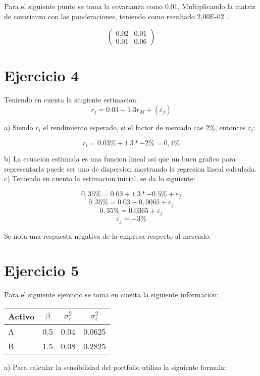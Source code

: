 \documentclass{article}
\begin{document}
Para el siguiente punto se toma la covarianza como 0.01, Multiplicando la matriz de covarianza con las ponderaciones, teniendo como resultado 2,00E-02
. 

\[
\begin{pmatrix}
0.02 & 0.01 \\
0.01 & 0.06
\end{pmatrix}
\]

\section{Ejercicio 4}
Teniendo en cuenta la siugiente estimacion.
\[
r_j = 0.03 + 1.3 r_M + (\varepsilon_j) 
\]

a) Siendo $r_i$ el rendimiento esperado, si el factor de mercado cae 2\%, entonces $r_i$:

\[
r_i = 0.03\% + 1.3 * -2\% = 0,4\%
\]

b) La ecuacion estimada es una funcion lineal asi que un buen grafico para representarla puede ser uno de dispersion mostrando la regresion lineal calculada.
\\

c) Teniendo en cuenta la estimacion inicial, se da lo siguiente:

\[
0,35\% = 0.03 + 1.3 * -0.5\% + \varepsilon_j
\]
\[
0,35\% = 0.03 - 0,0065 + \varepsilon_j 
\]
\[
0,35\% = 0.0365 + \varepsilon_j
\]
\[
 \varepsilon_j = -3\%
\]

Se nota una respuesta negativa de la empresa respecto al mercado.

\section{Ejercicio 5}

Para el siguiente ejercicio se toma en cuenta la siguiente informacion:

\begin{table}[h!]
\centering
\begin{tabular}{lccc}
\toprule
\textbf{Activo} & \(\beta\) & \(\sigma^2_r\) & \(\sigma^2_{\varepsilon}\) \\
\midrule
A & 0.5 & 0.04 & 0.0625 \\
B & 1.5 & 0.08 & 0.2825 \\
\bottomrule
\end{tabular}
\end{table}

a) Para calcular la sensibilidad del portfolio utilizo la siguiente formula:
\end{document}
